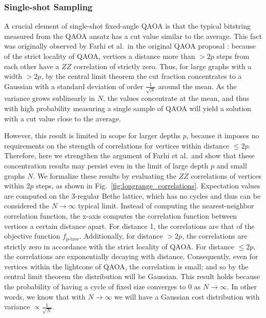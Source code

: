 \subsubsection{Single-shot Sampling}
\label{sec:single-shot}

A crucial element of single-shot fixed-angle QAOA is  that the typical bitstring measured from the QAOA ansatz has a cut value similar to the average. This fact was originally observed by Farhi et al.~in the original QAOA proposal \cite{farhi2014quantum}: because of the strict locality of QAOA, vertices a distance more than $>2p$ steps from each other have a $ZZ$ correlation of strictly zero. Thus, for large graphs with a width $>2p$, by the central limit theorem the cut fraction concentrates to a Gaussian with a standard deviation of order $\frac{1}{\sqrt{N}}$ around the mean. As the variance grows sublinearly in $N$, the values concentrate at the mean, and thus with high probability measuring a single sample of QAOA will yield a solution with a cut value close to the average.

However, this result is limited in scope for larger depths $p$, because it imposes no requirements on the strength of correlations for vertices within distance $\leq2p$. Therefore, here we strengthen the argument of Farhi et al.~and show that these concentration results may persist even in the limit of large depth $p$ and small graphs $N$. We formalize these results by evaluating the $ZZ$ correlations of vertices within $2p$ steps, as shown in Fig.~\ref{fig:longrange_correlations}. Expectation values are computed on the 3-regular Bethe lattice, which has no cycles and thus can be considered the $N\to\infty$ typical limit. Instead of computing the nearest-neighbor correlation function, the x-axis computes the correlation function between vertices a certain distance apart. For distance 1, the correlations are that of the objective function $f_\text{p-tree}$. Additionally, for  distance $>2p$, the correlations are strictly zero in accordance with the strict locality of QAOA. For distance $\leq 2p$, the correlations are exponentially decaying with distance. Consequently, even for vertices within the lightcone of QAOA, the correlation is small; and so by the central limit theorem the distribution will be Gaussian.
This result holds because the probability of having a cycle of fixed size converges to 0 as $N\to \infty$. 
In other words, we know that with $N\to\infty$ we will have a Gaussian cost distribution with variance $\propto\frac{1}{\sqrt N}$.

